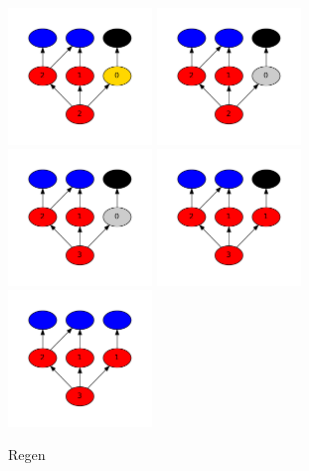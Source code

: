 \documentclass[12pt]{article}
\begin{document}
\begin{figure}
\includegraphics[width=1.5in]{tutorial_1/dot23.pdf}
\includegraphics[width=1.5in]{tutorial_1/dot24.pdf}
\includegraphics[width=1.5in]{tutorial_1/dot25.pdf}
\includegraphics[width=1.5in]{tutorial_1/dot26.pdf}
\includegraphics[width=1.5in]{tutorial_1/dot27.pdf}
\caption{Regen}
\label{fig:regen}
\end{figure}
\end{document}
